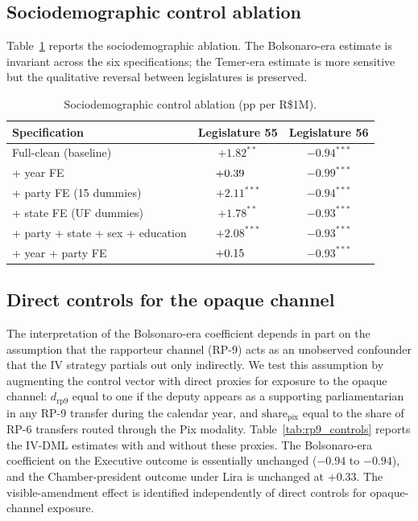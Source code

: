\documentclass[pdflatex,sn-basic]{sn-jnl}
\begin{document}
\subsection{Sociodemographic control ablation}
\label{app:ablation}

Table~\ref{tab:ablation} reports the sociodemographic ablation. The Bolsonaro-era estimate is invariant across the six specifications; the Temer-era estimate is more sensitive but the qualitative reversal between legislatures is preserved.

\begin{table}[htbp]
\centering
\caption{Sociodemographic control ablation (pp per R\$1M).}
\label{tab:ablation}
\small
\begin{tabular}{lcc}
\toprule
Specification & Legislature 55 & Legislature 56 \\
\midrule
Full-clean (baseline)                       & $+1.82^{**}$  & $-0.94^{***}$ \\
\quad + year FE                             & $+0.39\hspace{1.4em}$ & $-0.99^{***}$ \\
\quad + party FE (15 dummies)               & $+2.11^{***}$ & $-0.94^{***}$ \\
\quad + state FE (UF dummies)               & $+1.78^{**}$  & $-0.93^{***}$ \\
\quad + party + state + sex + education     & $+2.08^{***}$ & $-0.93^{***}$ \\
\quad + year + party FE                     & $+0.15\hspace{1.4em}$ & $-0.93^{***}$ \\
\bottomrule
\end{tabular}
\end{table}

\subsection{Direct controls for the opaque channel}
\label{app:rp9_controls}

The interpretation of the Bolsonaro-era coefficient depends in part on the assumption that the rapporteur channel (RP-9) acts as an unobserved confounder that the IV strategy partials out only indirectly. We test this assumption by augmenting the control vector with direct proxies for exposure to the opaque channel: $d_{\mathrm{rp9}}$ equal to one if the deputy appears as a supporting parliamentarian in any RP-9 transfer during the calendar year, and $\mathrm{share}_{\mathrm{pix}}$ equal to the share of RP-6 transfers routed through the Pix modality. Table~\ref{tab:rp9_controls} reports the IV-DML estimates with and without these proxies. The Bolsonaro-era coefficient on the Executive outcome is essentially unchanged ($-0.94$ to $-0.94$), and the Chamber-president outcome under Lira is unchanged at $+0.33$. The visible-amendment effect is identified independently of direct controls for opaque-channel exposure.
\end{document}
